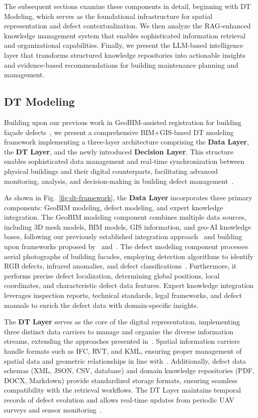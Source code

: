 \documentclass[a4paper,fleqn]{cas-sc}
\begin{document}
The subsequent sections examine these components in detail, beginning with DT Modeling, which serves as the foundational infrastructure for spatial representation and defect contextualization. We then analyze the RAG-enhanced knowledge management system that enables sophisticated information retrieval and organizational capabilities. Finally, we present the LLM-based intelligence layer that transforms structured knowledge repositories into actionable insights and evidence-based recommendations for building maintenance planning and management.

\subsection{DT Modeling}
Building upon our previous work in GeoBIM-assisted registration for building façade defects~\cite{zhang2024automated}, we present a comprehensive BIM+GIS-based DT modeling framework implementing a three-layer architecture comprising the \textbf{Data Layer}, the \textbf{DT Layer}, and the newly introduced \textbf{Decision Layer}. This structure enables sophisticated data management and real-time synchronization between physical buildings and their digital counterparts, facilitating advanced monitoring, analysis, and decision-making in building defect management~\cite{mill2013combined,pantoja2023damage}.

As shown in Fig.~\ref{fig:dt-framework}, the \textbf{Data Layer} incorporates three primary components: GeoBIM modeling, defect modeling, and expert knowledge integration. The GeoBIM modeling component combines multiple data sources, including 3D mesh models, BIM models, GIS information, and geo-AI knowledge bases, following our previously established integration approach~\cite{zhang2024automated} and building upon frameworks proposed by~\cite{xia2022study} and~\cite{chen2023improving}. The defect modeling component processes aerial photographs of building facades, employing detection algorithms to identify RGB defects, infrared anomalies, and defect classifications~\cite{shi2020review,hosamo2022digital}. Furthermore, it performs precise defect localization, determining global positions, local coordinates, and characteristic defect data features. Expert knowledge integration leverages inspection reports, technical standards, legal frameworks, and defect manuals to enrich the defect data with domain-specific insights.

The \textbf{DT Layer} serves as the core of the digital representation, implementing three distinct data carriers to manage and organize the diverse information streams, extending the approaches presented in~\cite{jati2021uav,fitkau2024ontology}. Spatial information carriers handle formats such as IFC, RVT, and KML, ensuring proper management of spatial data and geometric relationships in line with~\cite{li2024single,zeng2024conse}. Additionally, defect data schemas (XML, JSON, CSV, database) and domain knowledge repositories (PDF, DOCX, Markdown) provide standardized storage formats, ensuring seamless compatibility with the retrieval workflows. The DT Layer maintains temporal records of defect evolution and allows real-time updates from periodic UAV surveys and sensor monitoring~\cite{tan2022mapping,zhang2023automated}.
\end{document}
